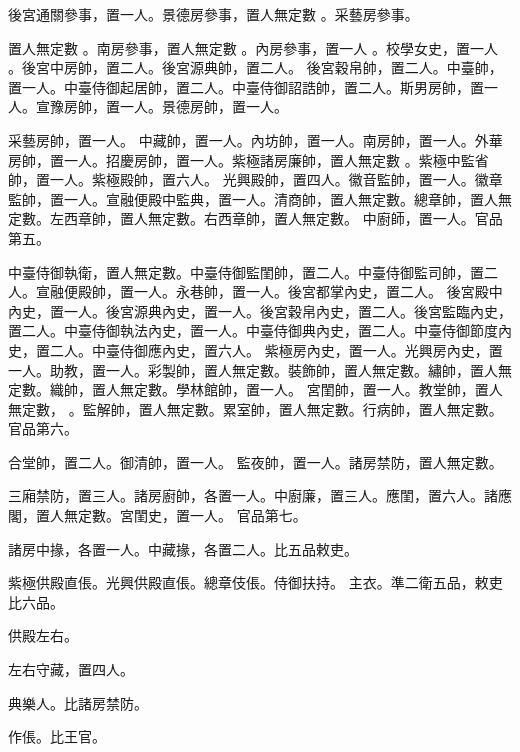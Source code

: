 \begin{pinyinscope}
後宮通關參事，置一人。景德房參事，置人無定數
 。采藝房參事。


置人無定數
 。南房參事，置人無定數
 。內房參事，置一人
 。校學女史，置一人
 。後宮中房帥，置二人。後宮源典帥，置二人。
 後宮穀帛帥，置二人。中臺帥，置一人。中臺侍御起居帥，置二人。中臺侍御詔誥帥，置二人。斯男房帥，置一人。宣豫房帥，置一人。景德房帥，置一人。


采藝房帥，置一人。
 中藏帥，置一人。內坊帥，置一人。南房帥，置一人。外華房帥，置一人。招慶房帥，置一人。紫極諸房廉帥，置人無定數
 。紫極中監省帥，置一人。紫極殿帥，置六人。
 光興殿帥，置四人。徽音監帥，置一人。徽章監帥，置一人。宣融便殿中監典，置一人。清商帥，置人無定數。總章帥，置人無定數。左西章帥，置人無定數。右西章帥，置人無定數。
 中廚師，置一人。官品第五。


中臺侍御執衛，置人無定數。中臺侍御監閨帥，置二人。中臺侍御監司帥，置二人。宣融便殿帥，置一人。永巷帥，置一人。後宮都掌內史，置二人。
 後宮殿中內史，置一人。後宮源典內史，置一人。後宮穀帛內史，置二人。後宮監臨內史，置二人。中臺侍御執法內史，置一人。中臺侍御典內史，置二人。中臺侍御節度內史，置二人。中臺侍御應內史，置六人。
 紫極房內史，置一人。光興房內史，置一人。助教，置一人。彩製帥，置人無定數。裝飾帥，置人無定數。繡帥，置人無定數。織帥，置人無定數。學林館帥，置一人。
 宮閨帥，置一人。教堂帥，置人無定數，
 。監解帥，置人無定數。累室帥，置人無定數。行病帥，置人無定數。官品第六。



 合堂帥，置二人。御清帥，置一人。
 監夜帥，置一人。諸房禁防，置人無定數。



 三廂禁防，置三人。諸房廚帥，各置一人。中廚廉，置三人。應閨，置六人。諸應閣，置人無定數。宮閨史，置一人。
 官品第七。



 諸房中掾，各置一人。中藏掾，各置二人。比五品敕吏。



 紫極供殿直倀。光興供殿直倀。總章伎倀。侍御扶持。
 主衣。準二衛五品，敕吏比六品。


供殿左右。



 左右守藏，置四人。



 典樂人。比諸房禁防。



 作倀。比王官。



\end{pinyinscope}
